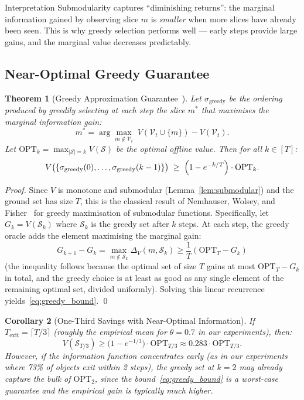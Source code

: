 \documentclass[11pt,a4paper]{article}
\newtheorem{theorem}{Theorem}[section]
\newtheorem{corollary}[theorem]{Corollary}
\newcommand{\cS}{\mathcal{S}}
\begin{document}
\begin{insightbox}{Interpretation}
Submodularity captures ``diminishing returns'': the marginal information gained by
observing slice $m$ is \emph{smaller} when more slices have already been seen.
This is why greedy selection performs well --- early steps provide large gains,
and the marginal value decreases predictably.
\end{insightbox}

\subsection{Near-Optimal Greedy Guarantee}

\begin{theorem}[Greedy Approximation Guarantee~{\cite{nemhauser1978,krause2014}}]
\label{thm:greedy}
Let $\sigma_\mathrm{greedy}$ be the ordering produced by greedily selecting at each
step the slice $m^*$ that maximises the marginal information gain:
\[
  m^* = \arg\max_{m \notin \mathcal{V}_t}\; V(\mathcal{V}_t \cup \{m\}) - V(\mathcal{V}_t).
\]
Let $\mathrm{OPT}_k = \max_{|\cS|=k} V(\cS)$ be the optimal offline value.  Then
for all $k \in [T]$:
\begin{equation}
  V\bigl(\{\sigma_\mathrm{greedy}(0), \ldots, \sigma_\mathrm{greedy}(k-1)\}\bigr)
  \;\geq\; \Bigl(1 - e^{-k/T}\Bigr) \cdot \mathrm{OPT}_k.
  \label{eq:greedy_bound}
\end{equation}
\end{theorem}

\begin{proof}
Since $V$ is monotone and submodular (Lemma~\ref{lem:submodular}) and the ground
set has size $T$, this is the classical result of Nemhauser, Wolsey, and Fisher~\cite{nemhauser1978}
for greedy maximisation of submodular functions.  Specifically, let
$G_k = V(\cS_k)$ where $\cS_k$ is the greedy set after $k$ steps.  At each step,
the greedy oracle adds the element maximising the marginal gain:
\[
  G_{k+1} - G_k = \max_{m \notin \cS_k} \Delta_V(m, \cS_k)
  \geq \frac{1}{T} (\mathrm{OPT}_T - G_k)
\]
(the inequality follows because the optimal set of size $T$ gains at most
$\mathrm{OPT}_T - G_k$ in total, and the greedy choice is at least as good as any
single element of the remaining optimal set, divided uniformly).  Solving this
linear recurrence yields~\eqref{eq:greedy_bound}.  \qed
\end{proof}

\begin{corollary}[One-Third Savings with Near-Optimal Information]
\label{cor:one_third}
If $T_\mathrm{exit} = \lceil T/3 \rceil$ (roughly the empirical mean for $\theta=0.7$
in our experiments), then:
\[
  V(\cS_{T/3}) \geq \bigl(1 - e^{-1/3}\bigr) \cdot \mathrm{OPT}_{T/3}
  \approx 0.283 \cdot \mathrm{OPT}_{T/3}.
\]
However, if the information function concentrates early (as in our experiments
where 73\% of objects exit within 2 steps), the greedy set at $k=2$ may already
capture the bulk of $\mathrm{OPT}_2$, since the bound~\eqref{eq:greedy_bound}
is a worst-case guarantee and the empirical gain is typically much higher.
\end{corollary}
\end{document}
